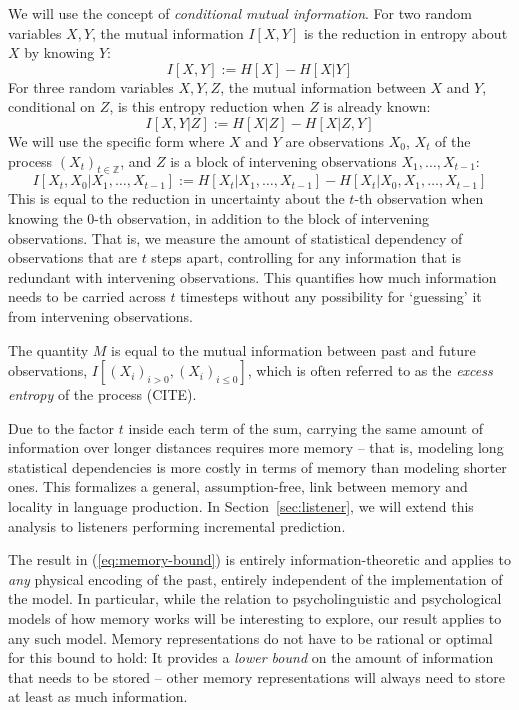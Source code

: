 \documentclass[11pt,letterpaper]{article}
\begin{document}
We will use the concept of \emph{conditional mutual information}.
For two random variables $X, Y$, the mutual information $I[X,Y]$ is the reduction in entropy about $X$ by knowing $Y$:
\begin{equation}
	I[X,Y] := H[X] - H[X|Y]
\end{equation}
For three random variables $X, Y, Z$, the mutual information between $X$ and $Y$, conditional on $Z$, is this entropy reduction when $Z$ is already known:
\begin{equation}
I[X,Y|Z] := H[X|Z] - H[X|Z,Y]
\end{equation}
We will use the specific form where $X$ and $Y$ are observations $X_0$, $X_t$ of the process $(X_t)_{t \in \mathbb{Z}}$, and $Z$ is a block of intervening observations $X_1, \dots, X_{t-1}$:
\begin{equation}
	I[X_t, X_0 | X_1, \dots, X_{t-1}] := H[X_t| X_1, \dots, X_{t-1}] - H[X_t| X_0, X_1, \dots, X_{t-1}]
\end{equation}
This is equal to the reduction in uncertainty about the $t$-th observation when knowing the $0$-th observation, in addition to the block of intervening observations.
That is, we measure the amount of statistical dependency of observations that are $t$ steps apart, controlling for any information that is redundant with intervening observations.
This quantifies how much information needs to be carried across $t$ timesteps without any possibility for `guessing' it from intervening observations.



The quantity $M$ is equal to the mutual information between past and future observations, $I[(X_i)_{i>0}, (X_i)_{i \leq 0}]$, which is often referred to as the \emph{excess entropy} of the process (CITE).




Due to the factor $t$ inside each term of the sum, carrying the same amount of information over longer distances requires more memory -- that is, modeling long statistical dependencies is more costly in terms of memory than modeling shorter ones.
This formalizes a general, assumption-free, link between memory and locality in language production.
In Section~\ref{sec:listener}, we will extend this analysis to listeners performing incremental prediction.


The result in (\ref{eq:memory-bound}) is entirely information-theoretic and applies to \emph{any} physical encoding of the past, entirely independent of the implementation of the model. %
In particular, while the relation to psycholinguistic and psychological models of how memory works will be interesting to explore, our result applies to any such model.
Memory representations do not have to be rational or optimal for this bound to hold:
It provides a \emph{lower bound} on the amount of information that needs to be stored -- other memory representations will always need to store at least as much information.
\end{document}

